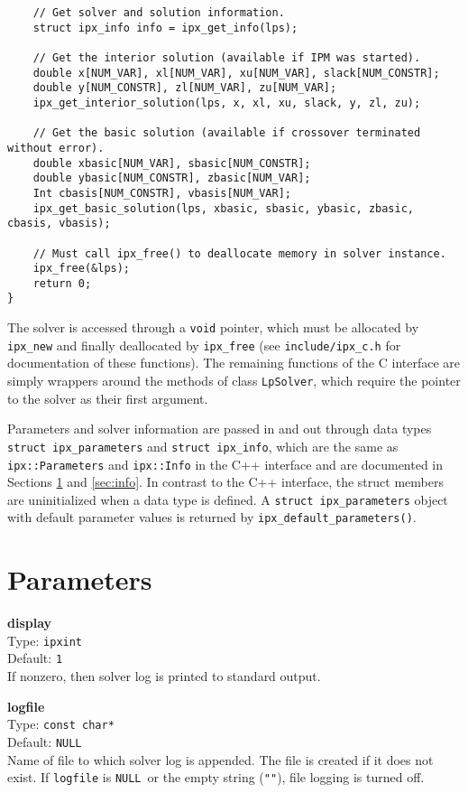 \documentclass{article}
\newcommand{\ct}{\texttt}
\newcommand{\NULL}{\ct{NULL}}
\newcommand{\param}[4]{
  \noindent\begin{minipage}{\textwidth}
    \textbf{#1}\\
    Type: \ct{#2}\\
    Default: \ct{#3}\\
    #4
  \end{minipage}
  \vskip 1\baselineskip
}
\begin{document}
\begin{footnotesize}
\begin{verbatim}
    // Get solver and solution information.
    struct ipx_info info = ipx_get_info(lps);

    // Get the interior solution (available if IPM was started).
    double x[NUM_VAR], xl[NUM_VAR], xu[NUM_VAR], slack[NUM_CONSTR];
    double y[NUM_CONSTR], zl[NUM_VAR], zu[NUM_VAR];
    ipx_get_interior_solution(lps, x, xl, xu, slack, y, zl, zu);

    // Get the basic solution (available if crossover terminated without error).
    double xbasic[NUM_VAR], sbasic[NUM_CONSTR];
    double ybasic[NUM_CONSTR], zbasic[NUM_VAR];
    Int cbasis[NUM_CONSTR], vbasis[NUM_VAR];
    ipx_get_basic_solution(lps, xbasic, sbasic, ybasic, zbasic, cbasis, vbasis);

    // Must call ipx_free() to deallocate memory in solver instance.
    ipx_free(&lps);
    return 0;
}
\end{verbatim}
\end{footnotesize}

The solver is accessed through a \ct{void} pointer, which must be allocated by
\ct{ipx\_new} and finally deallocated by \ct{ipx\_free} (see
\ct{include/ipx\_c.h} for documentation of these functions). The remaining
functions of the C interface are simply wrappers around the methods of class
\ct{LpSolver}, which require the pointer to the solver as their first argument.

Parameters and solver information are passed in and out through data types
\ct{struct ipx\_parameters} and \ct{struct ipx\_info}, which are the same as
\ct{ipx::Parameters} and \ct{ipx::Info} in the C++ interface and are documented
in Sections \ref{sec:parameters} and \ref{sec:info}. In contrast to the C++
interface, the struct members are uninitialized when a data type is defined.
A \ct{struct ipx\_parameters} object with default parameter values is returned
by \ct{ipx\_default\_parameters()}.

\section{Parameters}
\label{sec:parameters}

\param{display}{ipxint}{1}{
  If nonzero, then solver log is printed to standard output.
}

\param{logfile}{const char*}{\NULL}{
  Name of file to which solver log is appended. The file is created if it does
  not exist. If \ct{logfile} is \NULL\ or the empty string (\ct{""}), file
  logging is turned off.
}
\end{document}
